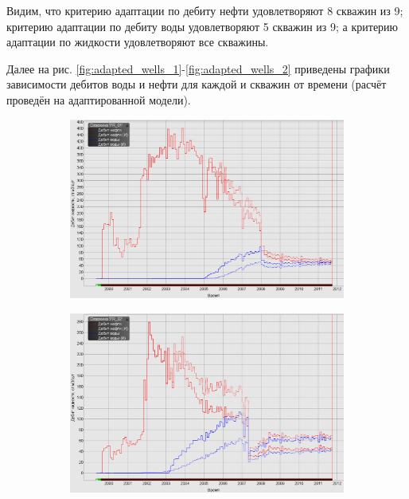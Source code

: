 \documentclass[a4paper,12pt]{article}
\begin{document}
Видим, что критерию адаптации по дебиту нефти удовлетворяют 8 скважин из 9; критерию адаптации по дебиту воды удовлетворяют 5 скважин из 9; а критерию адаптации по жидкости удовлетворяют все скважины.

Далее на рис. \ref{fig:adapted_wells_1}-\ref{fig:adapted_wells_2} приведены графики зависимости дебитов воды и нефти для каждой и скважин от времени (расчёт проведён на адаптированной модели).

\begin{figure}[H]
	\begin{subfigure}[t]{\dimexpr.5\linewidth-1.3em\relax}
		\centering
		\includegraphics[width=.95\linewidth]{aw1}
	\end{subfigure}
\hfill %
	\begin{subfigure}[t]{\dimexpr.5\linewidth-1.3em\relax}
		\centering
		\includegraphics[width=.95\linewidth]{aw2}

\end{subfigure}
\end{figure}
\end{document}

